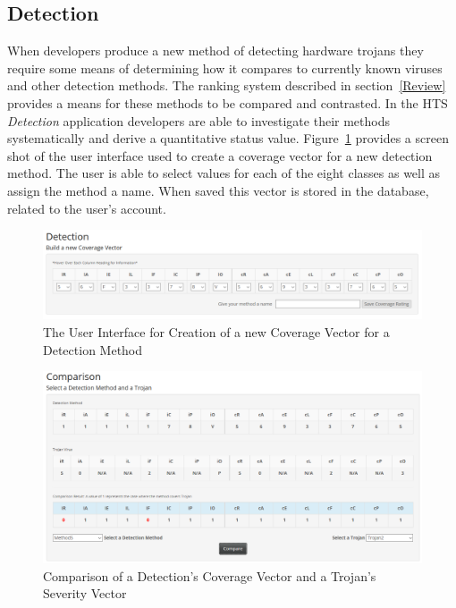 \subsection{Detection} \label{Application:Detection}
When developers produce a new method of detecting hardware trojans they require some means of determining how it compares to currently known viruses and other detection methods. The ranking system described in section~\ref{Review} provides a means for these methods to be compared and contrasted. In the HTS \textit{Detection} application developers are able to investigate their methods systematically and derive a quantitative status value. Figure~\ref{fig:newDetection} provides a screen shot of the user interface used to create a coverage vector for a new detection method. The user is able to select values for each of the eight classes as well as assign the method a name. When saved this vector is stored in the database, related to the user's account. 
\begin{figure}
	\centering
	\includegraphics[width=.9\linewidth]{figures/newDetection}
	\caption[The User Interface for Creation of a new Coverage Vector for a Detection Method]{The User Interface for Creation of a new Coverage Vector for a Detection Method}
	\label{fig:newDetection}
\end{figure}
\begin{figure}
	\centering
	\includegraphics[width=0.9\linewidth]{figures/comparison}
	\caption[Comparison of a Detection's Coverage Vector and a Trojan's Severity Vector]{Comparison of a Detection's Coverage Vector and a Trojan's Severity Vector}
	\label{fig:comparison}
\end{figure}
